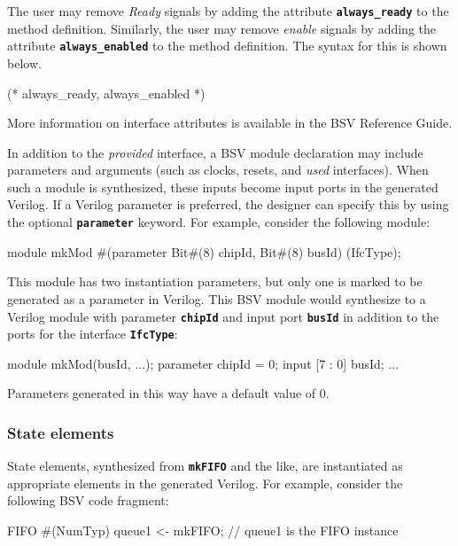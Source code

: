 \documentclass{article}
\newenvironment{centerboxverbatim}
  {\center
   \boxedverbatim}
  {\endboxedverbatim
  {\endcenter }}
\begin{document}
The user may remove \emph{Ready} signals
by adding the attribute {\bf\tt always\_ready}
to the method definition.
Similarly, the user may remove \emph{enable} signals
by adding the attribute {\bf\tt always\_enabled} to the method definition.
The syntax for this is shown below.

\begin{centerboxverbatim}
(* always_ready, always_enabled *)
\end{centerboxverbatim}

More information on interface attributes is available in the BSV
Reference Guide.

In addition to the {\it provided} interface, a BSV module declaration may
include parameters and arguments (such as clocks, resets, and
{\it used} interfaces).  When such a module is synthesized, these
inputs become input ports in the generated Verilog.  If a Verilog parameter
is preferred, the designer can specify this by using the optional
{\bf\tt parameter} keyword.  For example, consider the following module:

\begin{centerboxverbatim}
module mkMod #(parameter Bit#(8) chipId, Bit#(8) busId) (IfcType);
\end{centerboxverbatim}

This module has two instantiation parameters, but only one is marked
to be generated as a parameter in Verilog.  This BSV module would
synthesize to a Verilog module with parameter {\bf\tt chipId} and
input port {\bf\tt busId} in addition to the ports for the interface
{\bf\tt IfcType}:

\begin{centerboxverbatim}
module mkMod(busId,
             ...);
  parameter chipId = 0;
  input  [7 : 0] busId;
  ...
\end{centerboxverbatim}

Parameters generated in this way have a default value of 0.


\subsubsection{State elements}

State elements, synthesized from {\bf\tt mkFIFO} and the
like, are instantiated as appropriate elements in the generated
Verilog.  For example, consider the following BSV code fragment:

\begin{centerboxverbatim}
FIFO #(NumTyp) queue1 <- mkFIFO;   // queue1 is the FIFO instance
\end{centerboxverbatim}
\end{document}
